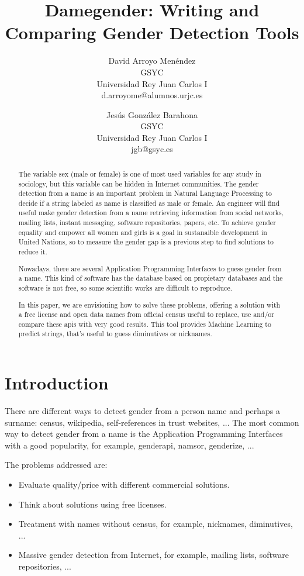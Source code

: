 \documentclass[a4paper]{article}
\title{Damegender: Writing and Comparing Gender Detection Tools}
\author{
David Arroyo Menéndez \\ GSYC \\ Universidad Rey Juan Carlos I \\ d.arroyome@alumnos.urjc.es
\and
Jesús González Barahona \\ GSYC \\ Universidad Rey Juan Carlos I \\ jgb@gsyc.es
}
\begin{document}
\maketitle

\begin{abstract}
The variable sex (male or female) is one of most used variables for
any study in sociology, but this variable can be hidden in Internet
communities. The gender detection from a name is an important problem
in Natural Language Processing to decide if a string labeled as name
is classified as male or female. An engineer will find useful
make gender detection from a name retrieving information from social
networks, mailing lists, instant messaging, software repositories,
papers, etc. To achieve gender equality and empower all women and
girls is a goal in sustanaible development in United Nations, so to
measure the gender gap is a previous step to find solutions to reduce
it.

Nowadays, there are several Application Programming Interfaces to
guess gender from a name. This kind of software has the database
based on propietary databases and the software is not free, so some
scientific works are difficult to reproduce.

In this paper, we are envisioning how to solve these problems,
offering a solution with a free license and open data names from
official census useful to replace, use and/or compare these apis with
very good results. This tool provides Machine Learning to predict
strings, that's useful to guess diminutives or nicknames.
\end{abstract}


\section{Introduction}

There are different ways to detect gender from a person name and
perhaps a surname: census, wikipedia, self-references in trust
websites, ... The most common way to detect gender from a name is the
Application Programming Interfaces with a good popularity, for
example, genderapi, namsor, genderize, ...
~\cite{10.7717/peerj-cs.156}

The problems addressed are:
\begin{itemize}
\item Evaluate quality/price with different commercial solutions.
\item Think about solutions using free licenses.
\item Treatment with names without census, for example, nicknames,
  diminutives, ...
\item Massive gender detection from Internet, for example, mailing
  lists, software repositories, ...
\end{itemize}
\end{document}
